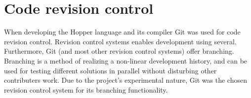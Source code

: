 \section{Code revision control}

When developing the Hopper language and its compiler Git was used for code revision control.
Revision control systems enables development using several. Furthermore, Git (and most other
revision control systems) offer branching. Branching is a method of realizing a non-linear
development history, and can be used for testing different solutions in parallel without
disturbing other contributers work. Due to the project's experimental nature, Git was the
chosen revision control system for its branching functionality.

